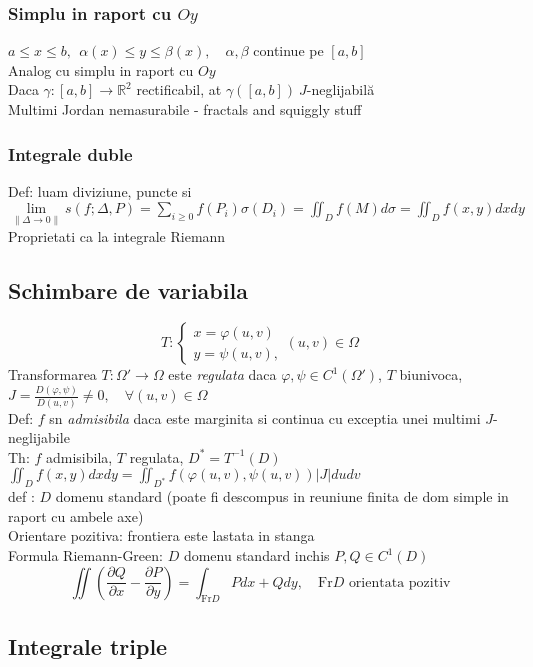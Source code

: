 \documentclass{article}
\newcommand{\parti}[2]{\frac{\partial #1}{ \partial #2}}
\newcommand*{\R}{\mathbb{R}}
\begin{document}
\subsubsection*{Simplu in raport cu $Oy$}
$ a\le x \le b,\ \ \alpha(x)\le y \le \beta(x), \quad \alpha, \beta $ continue pe $[a, b]$ \\
Analog cu simplu in raport cu $Oy$\\
Daca $\gamma: [a, b] \to \R^2$ rectificabil, at $\gamma([a, b])\ J$-neglijabilă\\
Multimi Jordan nemasurabile - fractals and squiggly stuff
\subsubsection*{Integrale duble}
Def: luam diviziune, puncte si $\displaystyle \lim\limits_{\|\Delta\to 0\|}s(f;\Delta, P) = \sum_{i\ge 0} f(P_i)\sigma(D_i)=\iint_Df(M)d\sigma=\iint_Df(x,y)dxdy$\\
Proprietati ca la integrale Riemann
\subsection*{Schimbare de variabila}
\[
  T: \begin{cases}
    x = \varphi(u, v)\\
    y = \psi(u, v),
  \end{cases}
   (u, v) \in \Omega
\]
Transformarea $T:\Omega'\to\Omega$ este \emph{regulata} daca $\varphi, \psi \in C^1(\Omega')$, $T$ biunivoca, $J = \frac{D(\varphi, \psi)}{D(u, v)} \neq 0, \quad
\forall (u, v) \in \Omega$\\
Def: $f$ sn \emph{admisibila} daca este marginita si continua cu exceptia unei multimi $J$-neglijabile\\
Th: $f$ admisibila, $T$ regulata, $D^* = T^{-1}(D)$\quad $\displaystyle \iint_D f(x, y) dxdy = \iint_{D^*} f(\varphi(u, v), \psi(u, v))|J| du dv $\\
def : $D$ domenu standard (poate fi descompus in reuniune finita de dom simple in raport cu ambele axe)\\
Orientare pozitiva: frontiera este lastata in stanga\\ 
Formula Riemann-Green: $D$ domenu standard inchis $P, Q \in C^1(D)$
\[\iint \left( \parti{Q}{x} - \parti{P}{y} \right) = \int_{\mathrm{Fr}D} Pdx+Qdy, \quad \mathrm{Fr}D \text{  orientata pozitiv} \]
\subsection*{Integrale triple}
\end{document}

